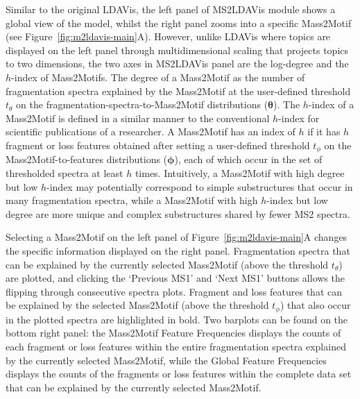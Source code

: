Similar to the original LDAVis, the left panel of MS2LDAVis module shows a global view of the model, whilst the right panel zooms into a specific Mass2Motif (see Figure~\ref{fig:m2ldavis-main}A). However, unlike LDAVis where topics are displayed on the left panel through multidimensional scaling that projects topics to two dimensions, the two axes in MS2LDAVis panel are the log-degree and the $h$-index of Mass2Motifs. The degree of a Mass2Motif as the number of fragmentation spectra explained by the Mass2Motif at the user-defined threshold $t_{\theta}$ on the fragmentation-spectra-to-Mass2Motif distributions ($\boldsymbol{\theta}$). The $h$-index of a Mass2Motif is defined in a similar manner to the conventional $h$-index for scientific publications of a researcher. A Mass2Motif has an index of $h$ if it has $h$ fragment or loss features obtained after setting a user-defined threshold $t_{\phi}$ on the Mass2Motif-to-features distributions ($\boldsymbol{\phi}$), each of which occur in the set of thresholded spectra at least $h$ times. Intuitively, a Mass2Motif with high degree but low $h$-index may potentially correspond to simple substructures that occur in many fragmentation spectra, while a Mass2Motif with high $h$-index but low degree are more unique and complex substructures shared by fewer MS2 spectra.

Selecting a Mass2Motif on the left panel of Figure~\ref{fig:m2ldavis-main}A changes the specific information displayed on the right panel. Fragmentation spectra that can be explained by the currently selected Mass2Motif (above the threshold $t_{\theta}$) are plotted, and clicking the ‘Previous MS1’ and ‘Next MS1’ buttons allows the flipping through consecutive spectra plots. Fragment and loss features that can be explained by the selected Mass2Motif (above the threshold $t_{\phi}$) that also occur in the plotted spectra are highlighted in bold. Two barplots can be found on the bottom right panel: the Mass2Motif Feature Frequencies displays the counts of each fragment or loss features within the entire fragmentation spectra explained by the currently selected Mass2Motif, while the Global Feature Frequencies displays the counts of the fragments or loss features within the complete data set that can be explained by the currently selected Mass2Motif.

